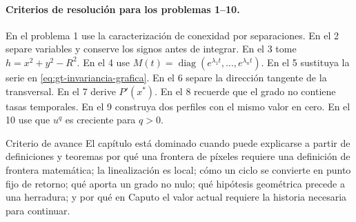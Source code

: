\paragraph{Criterios de resolución para los problemas 1--10.}
En el problema 1 use la caracterización de conexidad por separaciones. En el 2 separe
variables y conserve los signos antes de integrar. En el 3 tome
$h=x^2+y^2-R^2$. En el 4 use
$M(t)=\operatorname{diag}(e^{\lambda_1t},\ldots,e^{\lambda_nt})$. En el 5 sustituya
la serie en \eqref{eq:gt-invariancia-grafica}. En el 6 separe la dirección tangente de
la transversal. En el 7 derive $P'(x^*)$. En el 8 recuerde que el grado no contiene
tasas temporales. En el 9 construya dos perfiles con el mismo valor en cero. En el 10
use que $u^q$ es creciente para $q>0$.

\begin{evidencebox}{Criterio de avance}
El capítulo está dominado cuando puede explicarse a partir de definiciones y teoremas por qué una
frontera de píxeles requiere una definición de frontera matemática; la linealización es
local; cómo un ciclo se convierte en punto fijo de retorno; qué aporta un grado no
nulo; qué hipótesis geométrica precede a una herradura; y por qué en Caputo el valor
actual requiere la historia necesaria para continuar.
\end{evidencebox}
